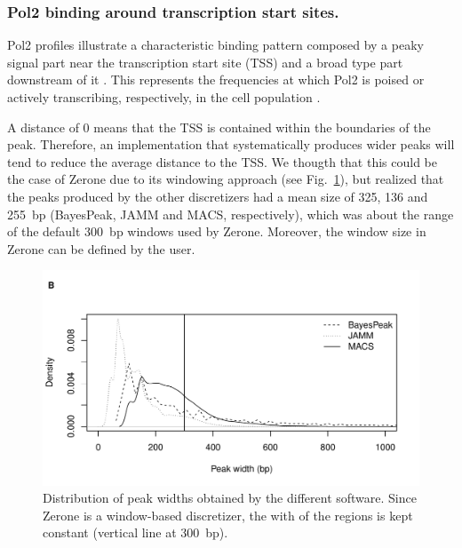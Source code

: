 \documentclass{bioinfo}
\begin{document}


\subsubsection{Pol2 binding around transcription start sites.}
Pol2 profiles illustrate a characteristic binding pattern composed by a peaky
signal part near the transcription start site (TSS) and a broad type part
downstream of it \citep{pmid}. This represents the frequencies
at which Pol2 is poised or actively transcribing, respectively,
in the cell population \citep{pmid}.


A distance of 0 means that the TSS is contained within the boundaries of the
peak. Therefore, an implementation that systematically produces wider peaks
will tend to reduce the average distance to the TSS. We thougth that this could
be the case of Zerone due to its windowing approach
(see Fig.~\ref{fig:peak_width}),
but realized that the peaks produced by the other discretizers had a mean
size of 325, 136 and 255~bp (BayesPeak, JAMM and MACS, respectively), which
was about the range of the default 300~bp windows used by Zerone. Moreover,
the window size in Zerone can be defined by the user.

\begin{figure}[!tpb]
\centerline{\includegraphics[scale=0.5]{peak_width.pdf}}
\caption{Distribution of peak widths obtained by the different software.
Since Zerone is a window-based discretizer, the with of the regions is kept
constant (vertical line at 300~bp).}\label{fig:peak_width}
\end{figure}
\end{document}
